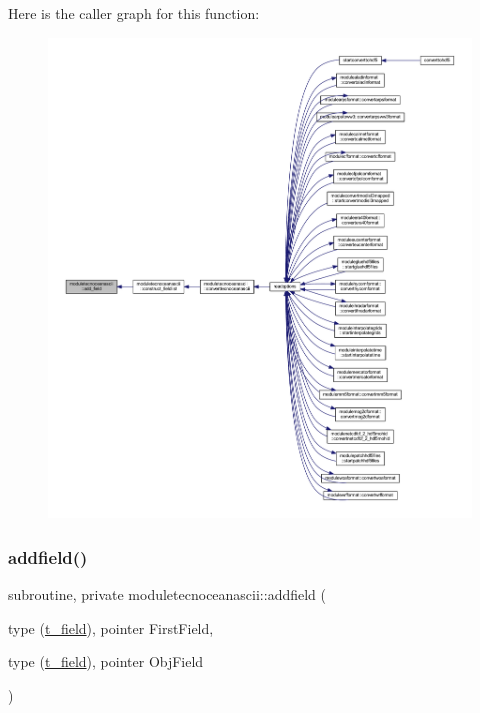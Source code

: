 Here is the caller graph for this function\+:\nopagebreak
\begin{figure}[H]
\begin{center}
\leavevmode
\includegraphics[width=350pt]{namespacemoduletecnoceanascii_a3b498ef686c47e5dae7627d7045ed16a_icgraph}
\end{center}
\end{figure}
\mbox{\label{namespacemoduletecnoceanascii_a361f990e2a215ebad88b6439bbc0ccaf}} 
\subsubsection{\texorpdfstring{addfield()}{addfield()}}
{\footnotesize\ttfamily subroutine, private moduletecnoceanascii\+::addfield (\begin{DoxyParamCaption}\item[{type (\mbox{\hyperlink{structmoduletecnoceanascii_1_1t__field}{t\+\_\+field}}), pointer}]{First\+Field,  }\item[{type (\mbox{\hyperlink{structmoduletecnoceanascii_1_1t__field}{t\+\_\+field}}), pointer}]{Obj\+Field }\end{DoxyParamCaption})\hspace{0.3cm}{\ttfamily [private]}}

